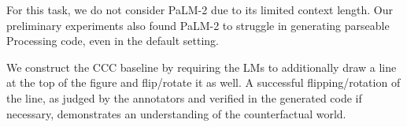 For this task, we do not consider PaLM-2 due to its limited context length. Our preliminary experiments also found PaLM-2  to struggle in generating parseable Processing code, even in the default setting.

We construct the CCC baseline by requiring the LMs to additionally draw a line at the top of the figure and flip/rotate it as well. A successful flipping/rotation of the line, as judged by the annotators and verified in the generated code if necessary, demonstrates an understanding of the counterfactual world.
